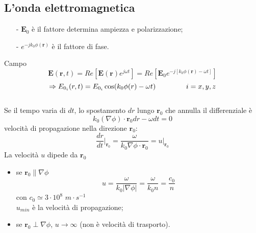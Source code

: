 \documentclass[a4paper]{article}
\begin{document}
\subsection*{L'onda elettromagnetica}
\begin{itemize}
\item[-] $\textbf{E}_0$ è il fattore determina ampiezza e polarizzazione;
\item[-] $e^{-jk_0\phi(\textbf{r})}$ è il fattore di fase. 
\end{itemize}
Campo
\begin{equation*}
\textbf{E}(\textbf{r},t)=Re\left[\textbf{E}(\textbf{r})e^{j\omega t}\right]=Re\left[\textbf{E}_0e^{-j[k_0\phi(\textbf{r})-\omega t]}\right]
\end{equation*}
\begin{equation*}
\Rightarrow E_{0_i}(r,t)=E_{0_i}\cos(k_0\phi(r)-\omega t)\hspace{15mm}i=x,y,z
\end{equation*}
\\Se il tempo varia di $dt$, lo spostamento $dr$ lungo $\textbf{r}_0$ che annulla il differenziale è
\begin{equation*}
k_0(\nabla\phi)\cdot\textbf{r}_0dr-\omega dt=0
\end{equation*}
velocità di propagazione nella direzione $\textbf{r}_0$:
\begin{equation*}
\frac{dr}{dt}\biggl|_{\textbf{r}_0}=\frac{\omega}{k_0\nabla\phi\cdot\textbf{r}_0}=u\big|_{\textbf{r}_0}
\end{equation*}
La velocità $u$ dipede da $\textbf{r}_0$
\begin{itemize}
\item se $\textbf{r}_0\parallel\nabla\phi$
\begin{equation*}
u=\frac{\omega}{k_0|\nabla\phi|}=\frac{\omega}{k_0n}=\frac{c_0}{n}
\end{equation*}
con $c_0\simeq 3\cdot10^8\,\,m\cdot s^{-1}$\\
$u_{min}$ è la velocità di propagazione;
\item se $\textbf{r}_0\perp\nabla\phi$, $u\rightarrow\infty$ (non è velocità di trasporto).
\end{itemize}
\end{document}

